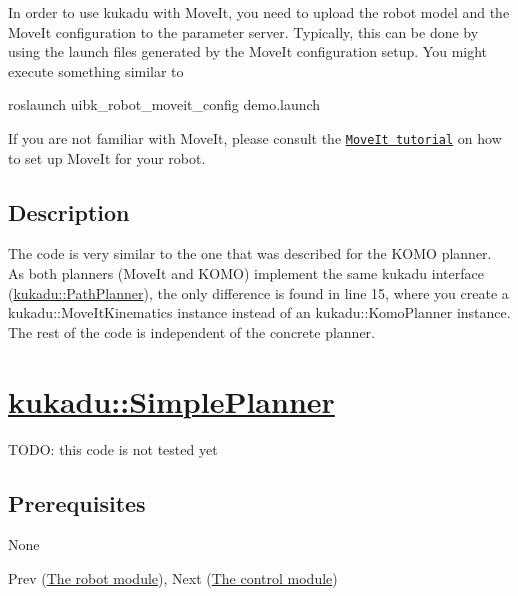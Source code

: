 In order to use kukadu with Move\+It, you need to upload the robot model and the Move\+It configuration to the parameter server. Typically, this can be done by using the launch files generated by the Move\+It configuration setup. You might execute something similar to 
\begin{DoxyCode}
roslaunch uibk\_robot\_moveit\_config demo.launch
\end{DoxyCode}
 If you are not familiar with Move\+It, please consult the \href{http://moveit.ros.org/documentation/tutorials/}{\tt Move\+It tutorial} on how to set up Move\+It for your robot.

\subsection*{Description}

The code is very similar to the one that was described for the K\+O\+MO planner. As both planners (Move\+It and K\+O\+MO) implement the same kukadu interface (\hyperlink{classkukadu_1_1PathPlanner}{kukadu\+::\+Path\+Planner}), the only difference is found in line 15, where you create a kukadu\+::\+Move\+It\+Kinematics instance instead of an kukadu\+::\+Komo\+Planner instance. The rest of the code is independent of the concrete planner.

\section*{\hyperlink{classkukadu_1_1SimplePlanner}{kukadu\+::\+Simple\+Planner}}

T\+O\+DO\+: this code is not tested yet


\begin{DoxyCodeInclude}
\end{DoxyCodeInclude}


\subsection*{Prerequisites}

None

Prev (\hyperlink{robotpage}{The robot module}), Next (\hyperlink{controlpage}{The control module}) 